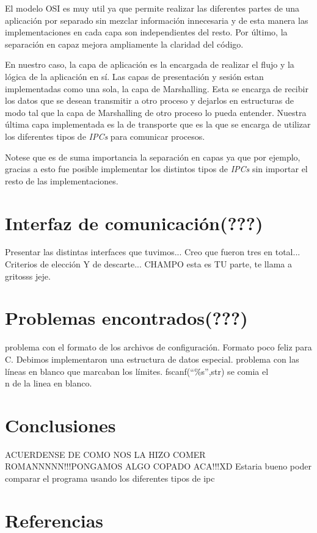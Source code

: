 \documentclass[a4paper,10pt]{article}
\begin{document}
El modelo OSI es muy util ya que permite realizar las diferentes partes de una aplicación por separado sin mezclar información innecesaria y de esta manera las implementaciones en cada capa son independientes del resto. Por último, la separación en capaz mejora ampliamente la claridad del código.

En nuestro caso, la capa de aplicación es la encargada de realizar el flujo y la lógica de la aplicación en sí. Las capas de presentación y sesión estan implementadas como una sola, la capa de Marshalling. Esta se encarga de recibir los datos que se desean transmitir a otro proceso y dejarlos en estructuras de modo tal que la capa de Marshalling de otro proceso lo pueda entender. Nuestra última capa implementada es la de transporte que es la que se encarga de utilizar los diferentes tipos de \textit{IPCs} para comunicar procesos.

Notese que es de suma importancia la separación en capas ya que por ejemplo, gracias a esto fue posible implementar los distintos tipos de \textit{IPCs} sin importar el resto de las implementaciones.

\newpage
\section{Interfaz de comunicación(???)}
Presentar las distintas interfaces que tuvimos...
Creo que fueron tres en total... 
Criterios de elección Y de descarte...
CHAMPO esta es TU parte, te llama a gritosss jeje.

\newpage
\section{Problemas encontrados(???)}
problema con el formato de los archivos de configuración. Formato poco feliz para C. Debimos implementaron una estructura de datos especial. 
problema con las líneas en blanco que marcaban los límites. fscanf(``\%s'',str) se comia el \\n de la linea en blanco. 

\newpage
\section{Conclusiones}
ACUERDENSE DE COMO NOS LA HIZO COMER ROMANNNNN!!!PONGAMOS ALGO COPADO ACA!!!XD
Estaria bueno poder comparar el programa usando los diferentes tipos de ipc

\newpage     
\section{Referencias}
\end{document}
